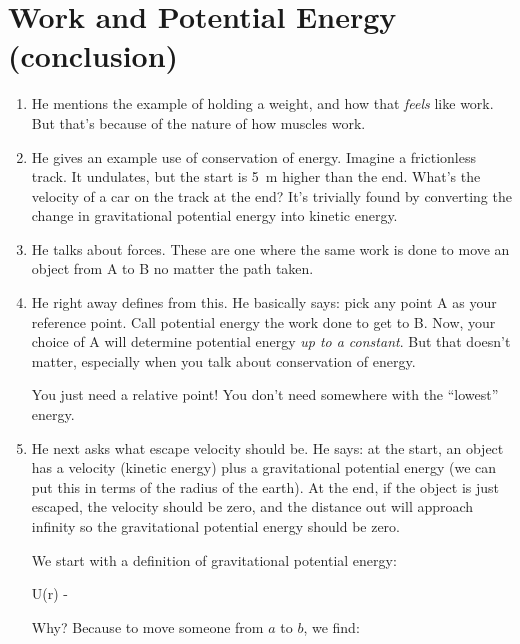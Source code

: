 \section{Work and Potential Energy (conclusion)}

\begin{enumerate}

  \item He mentions the example of holding a weight, and how that
  \emph{feels} like work. But that's because of the nature of how
  muscles work.

  \item He gives an example use of conservation of energy. Imagine a
  frictionless track. It undulates, but the start is \SI{5}{m} higher
  than the end. What's the velocity of a car on the track at the end?
  It's trivially found by converting the change in gravitational
  potential energy into kinetic energy.

  \item He talks about  forces. These are one where
  the same work is done to move an object from A to B no matter the path
  taken.

  \item He right away defines  from this. He
  basically says: pick any point A as your reference point. Call
  potential energy the work done to get to B. Now, your choice of A will
  determine potential energy \emph{up to a constant}. But that doesn't
  matter, especially when you talk about conservation of energy.

  You just need a relative point! You don't need somewhere with the
  ``lowest'' energy.

  \item He next asks what escape velocity should be. He says: at the
  start, an object has a velocity (kinetic energy) plus a gravitational
  potential energy (we can put this in terms of the radius of the
  earth). At the end, if the object is just escaped, the velocity should
  be zero, and the distance out will approach infinity so the
  gravitational potential energy should be zero.

  We start with a definition of gravitational potential energy:

  \begin{nedqn}
    U(r)
  \eqcol
    -
  \end{nedqn}

  Why? Because to move someone from $a$ to $b$, we find:


\end{enumerate}

